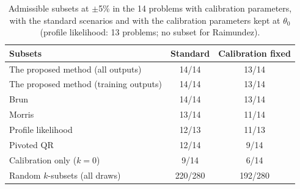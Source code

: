 \begin{table}[H]
\centering\small
\caption{Admissible subsets at $\pm$5\% in the 14 problems with calibration parameters, with the standard scenarios and with the calibration parameters kept at $\theta_0$ (profile likelihood: 13 problems; no subset for Raimundez).}\label{tab:calfixedcrit}
\begin{tabular}{@{}lcc@{}}
\toprule
Subsets & Standard & Calibration fixed \\
\midrule
The proposed method (all outputs) & 14/14 & 13/14 \\
The proposed method (training outputs) & 14/14 & 13/14 \\
Brun & 14/14 & 13/14 \\
Morris & 13/14 & 11/14 \\
Profile likelihood & 12/13 & 11/13 \\
Pivoted QR & 12/14 & 9/14 \\
Calibration only ($k=0$) & 9/14 & 6/14 \\
Random $k$-subsets (all draws) & 220/280 & 192/280 \\
\bottomrule
\end{tabular}
\end{table}
